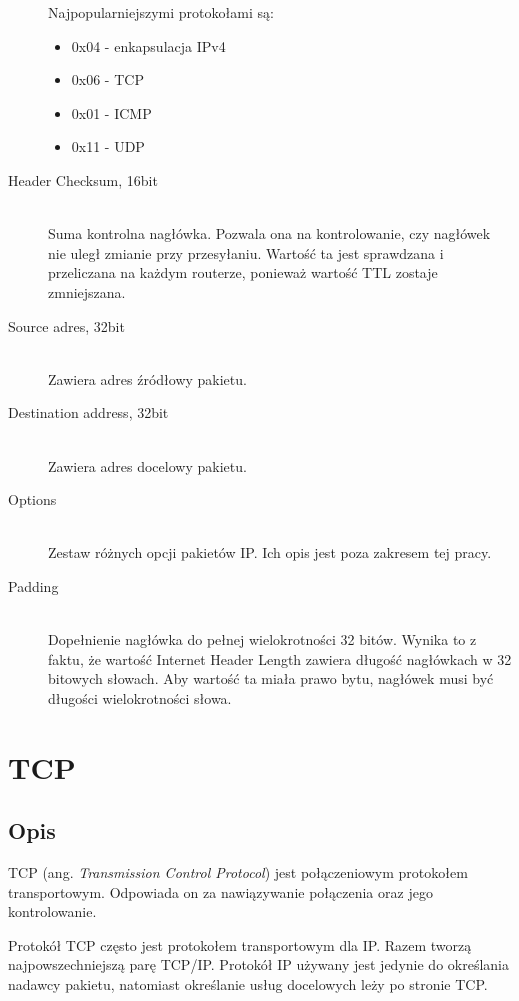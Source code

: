 \begin{description}
				Najpopularniejszymi protokołami są:
				\begin{itemize}
					\item 0x04 - enkapsulacja IPv4
					\item 0x06 - TCP
					\item 0x01 - ICMP
					\item 0x11 - UDP
				\end{itemize}
			\item[Header Checksum, 16bit]\hfill \\
				Suma kontrolna nagłówka.
				Pozwala ona na kontrolowanie, czy nagłówek nie uległ zmianie przy przesyłaniu.
				Wartość ta jest sprawdzana i przeliczana na każdym routerze, ponieważ wartość TTL zostaje zmniejszana.
			\item[Source adres, 32bit]\hfill \\
				Zawiera adres źródłowy pakietu.
			\item[Destination address, 32bit]\hfill \\
				Zawiera adres docelowy pakietu.
			\item[Options]\hfill \\
				Zestaw różnych opcji pakietów IP.
				Ich opis jest poza zakresem tej pracy.
			\item[Padding]\hfill \\
				Dopełnienie nagłówka do pełnej wielokrotności 32 bitów.
				Wynika to z faktu, że wartość Internet Header Length zawiera długość nagłówkach w 32 bitowych słowach.
				Aby wartość ta miała prawo bytu, nagłówek musi być długości wielokrotności słowa.
			\end{description}	
	\section{TCP}
		\subsection{Opis}
			TCP (ang. \textit{Transmission Control Protocol}) jest połączeniowym protokołem transportowym.
			Odpowiada on za nawiązywanie połączenia oraz jego kontrolowanie.

			Protokół TCP często jest protokołem transportowym dla IP.
			Razem tworzą najpowszechniejszą parę TCP/IP.
			Protokół IP używany jest jedynie do określania nadawcy pakietu, natomiast określanie usług docelowych leży po stronie TCP.\\

